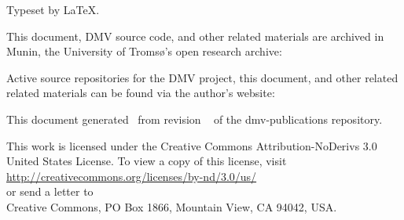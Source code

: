 
\clearpage
\vspace*{\fill}

Typeset by \LaTeX.

This document, \gls{DMV} source code, and other related materials are archived
in Munin, the University of Tromsø's open research archive: \\
\muninurl

Active source repositories for the \gls{DMV} project, this document, and other
related related materials can be found via the author's website: \\
\dmvurl

This document generated \GITAuthorDate\ from revision
\ifx\GITTags\empty
\GITAbrHash
\else
\GITAbrHash\ \GITTags
\fi
{} of the dmv-publications repository.

This work is licensed under the Creative Commons Attribution-NoDerivs 3.0 United
States License. To view a copy of this license, visit \\
\url{http://creativecommons.org/licenses/by-nd/3.0/us/} \\
or send a letter to \\
Creative Commons, PO Box 1866, Mountain View, CA 94042, USA.
